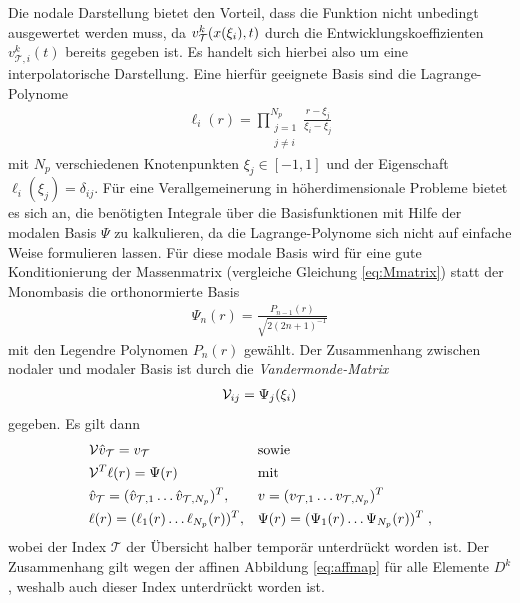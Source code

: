 Die nodale Darstellung bietet den Vorteil, dass die Funktion nicht unbedingt ausgewertet werden muss, da $v_{\mathcal{T}}^k(x(\xi_i),t)$ durch die Entwicklungskoeffizienten $v_{\mathcal{T},i}^k(t)$ bereits gegeben ist. Es handelt sich hierbei also um eine interpolatorische Darstellung.
Eine hierfür geeignete Basis sind die Lagrange-Polynome
\begin{align}
  \ell_i(r) = \prod_{\substack{j=1 \\ j\neq i}}^{N_p} \frac{r-\xi_j}{\xi_i-\xi_j}
\end{align}
mit $N_p$ verschiedenen Knotenpunkten $\xi_j\in[-1,1]$ und der Eigenschaft ${\ell_i(\xi_j)=\delta_{ij}}$. Für eine Verallgemeinerung in höherdimensionale Probleme bietet es sich an, die benötigten Integrale über die Basisfunktionen mit Hilfe der modalen Basis $\Psi$ zu kalkulieren, da die Lagrange-Polynome sich nicht auf einfache Weise formulieren lassen. Für diese modale Basis wird für eine gute Konditionierung der Massenmatrix (vergleiche Gleichung \eqref{eq:Mmatrix}) statt der Monombasis die orthonormierte Basis
\begin{align}
  \Psi_n(r) = \frac{P_{n-1}(r)}{\sqrt{2(2n+1)^{-1}}}
  \label{eq:modaleBasis}
\end{align}
mit den Legendre Polynomen $P_n(r)$ gewählt. Der Zusammenhang zwischen nodaler und modaler Basis ist durch die \emph{Vandermonde-Matrix}
\begin{equation}
  \begin{aligned}
    \mathcal{V}_{ij} = \Psi_j(\xi_i)
  \end{aligned}
  \label{eq:vandermonde}
\end{equation}
gegeben. Es gilt dann
  \begin{align}
    &\mathcal{V}\hat{v}_{\mathcal{T}} = v_{\mathcal{T}}        & &\text{sowie} \label{eq:nodalmodal}\\
    &\mathcal{V}^T\ell(r) = \Psi(r) & &\text{mit} \label{eq:ellPsi}\\
    &\hat{v}_{\mathcal{T}} = (\hat{v}_{\mathcal{T},1} \dots \hat{v}_{\mathcal{T},N_p})^T, & & v =(v_{\mathcal{T},1} \dots v_{\mathcal{T},N_p})^T \nonumber \\
    &\ell(r) = (\ell_1(r) \dots \ell_{N_p}(r))^T, & & \Psi(r) =(\Psi_1(r) \dots \Psi_{N_p}(r))^T \nonumber \; ,
  \end{align}
wobei der Index $\mathcal{T}$ der Übersicht halber temporär unterdrückt worden ist. Der Zusammenhang gilt wegen der affinen Abbildung \eqref{eq:affmap} für alle Elemente $D^k$, weshalb auch dieser Index unterdrückt worden ist.

